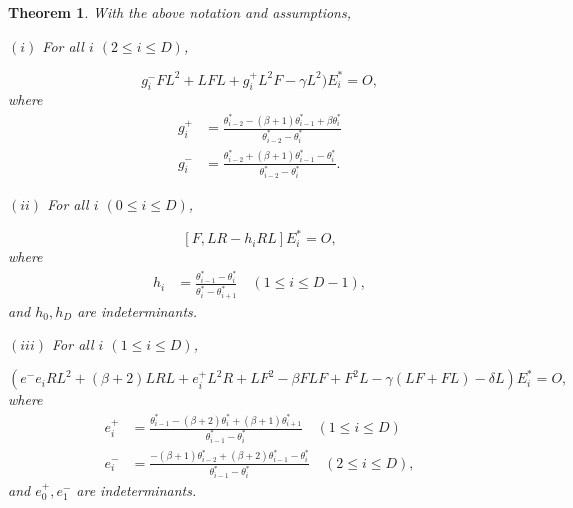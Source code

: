 \documentclass[
]{book}
\newtheorem{theorem}{Theorem}[chapter]
\theoremstyle{definition}
\theoremstyle{definition}
\theoremstyle{definition}
\theoremstyle{definition}
\theoremstyle{remark}
\begin{document}
\begin{theorem}
\protect\hypertarget{thm:rfl-relations}{}\label{thm:rfl-relations}With the above notation and assumptions,

\((i)\) For all \(i\) \((2\leq i\leq D)\),

\[g^-_iFL^2 + LFL + g^+_iL^2F - \gamma L^2)E^*_i = O,\]
where
\begin{align}
g^+_i & = \frac{\theta^*_{i-2}-(\beta+1)\theta^*_{i-1}+\beta\theta^*_i}{\theta^*_{i-2}-\theta^*_i}\\
g^-_i & = \frac{\theta^*_{i-2}+(\beta+1)\theta^*_{i-1}-\theta^*_i}{\theta^*_{i-2}-\theta^*_i}.
\end{align}

\((ii)\) For all \(i\) \((0\leq i\leq D)\),

\[[F, LR - h_iRL]E^*_i = O,\]
where
\begin{align}
h_i & = \frac{\theta^*_{i-1}-\theta^*_i}{\theta^*_i-\theta^*_{i+1}} \quad (1\leq i\leq D-1),
\end{align}
and \(h_0, h_D\) are indeterminants.

\((iii)\) For all \(i\) \((1\leq i\leq D)\),

\[(e^-e_iRL^2 + (\beta+2)LRL + e^+_iL^2R + LF^2 - \beta FLF + F^2L - \gamma(LF+FL) - \delta L)E^*_i = O,\]
where
\begin{align}
e^+_i & = \frac{\theta^*_{i-1}-(\beta+2)\theta^*_{i}+(\beta+1)\theta^*_{i+1}}{\theta^*_{i-1}-\theta^*_i} \quad (1\leq i\leq D)\\
e^-_i & = \frac{-(\beta+1)\theta^*_{i-2}+(\beta+2)\theta^*_{i-1}-\theta^*_i}{\theta^*_{i-1}-\theta^*_i} \quad (2\leq i\leq D),
\end{align}
and \(e^+_0, e^-_1\) are indeterminants.
\end{theorem}
\end{document}
